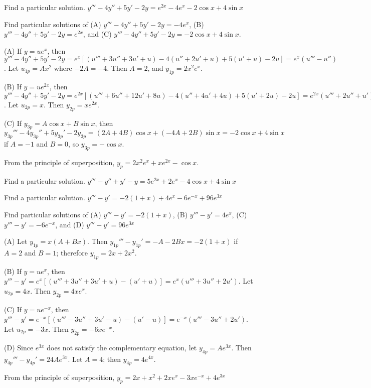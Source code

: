 \documentclass{ximera}
\begin{document}
\begin{problem}\label{exer:9.3.48}   Find a particular solution.   $y'''-4y''+5y'-2y=e^{2x}-4e^x-2\cos x+4\sin x$

\begin{hint}
Find particular solutions of
(A) $y'''-4y''+5y'-2y=-4e^x$,
(B) $y'''-4y''+5y'-2y=e^{2x}$,
and  (C) $y'''-4y''+5y'-2y=-2\cos x+4\sin x$.
\end{hint}

\begin{solution}
(A) If $y=ue^x$, then
$y'''-4y''+5y'-2y=e^x[(u'''+3u''+3u'+u) -4(u''+2u'+u) +5(u'+u)
-2u]=e^x(u'''-u'')$. Let $u_{1p}=Ax^2$ where $-2A=-4$. Then $A=2$,
and $y_{1p}=2x^2e^x$.

(B) If $y=ue^{2x}$, then
$y'''-4y''+5y'-2y=e^{2x}[(u'''+6u''+12u'+8u) -4(u''+4u'+4u) +5(u'+2u)
-2u ]=e^{2x}(u'''+2u''+u')$. Let $u_{2p}=x$. Then $y_{2p}=xe^{2x}$.

(C)  If $y_{3p}=A\cos x+B\sin x$, then
$y_{3p}'''-4y_{3p}''+5y_{3p}'-2y_{3p}=(2A+4B)\cos x+(-4A+2B)\sin x=
-2\cos x+4\sin x$
if  $A=-1$ and $B=0$, so
$y_{3p}=-\cos x$.

From the principle of superposition,
 $y_p=2x^2e^x+xe^{2x}-\cos x$.
\end{solution}
\end{problem}

\begin{problem}\label{exer:9.3.49}   Find a particular solution.   $y'''-y''+y'-y=5e^{2x}+2e^x-4\cos x+4\sin x$
\end{problem}

\begin{problem}\label{exer:9.3.50}   Find a particular solution.   $y'''-y'=-2(1+x)+4e^x-6e^{-x}+96e^{3x}$

\begin{hint}
Find particular solutions of (A)
$y'''-y'=-2(1+x)$, (B) $y'''-y'=4e^x$, (C)
$y'''-y'=-6e^{-x}$, and (D) $y'''-y'=96e^{3x}$
\end{hint}

\begin{solution}
(A) Let $y_{1p}=x(A+Bx)$. Then $y_{1p}'''-y_{1p}'=-A-2Bx=-2(1+x)$
if $A=2$ and $B=1$; therefore $y_{1p}=2x+2x^2$.

(B) If $y=ue^x$, then $y'''-y'=e^x [(u'''+3u''+3u'+u)
-(u'+u)]=e^x(u'''+3u''+2u')$. Let $u_{2p}=4x$. Then $y_{2p}=4xe^x$.

(C) If $y=ue^{-x}$, then $y'''-y'=e^{-x} [(u'''-3u''+3u'-u)
-(u'-u)]=e^{-x}(u'''-3u''+2u')$. Let $u_{2p}=-3x$. Then
$y_{2p}=-6xe^{-x}$.

(D) Since $e^{3x}$ does not satisfy the complementary equation,
let $y_{4p}=Ae^{3x}$. Then $y_{4p}'''-y_{4p}' =24Ae^{3x}$. Let $A=4$;
then $y_{4p}=4e^{4x}$.

From the principle of superposition,
$y_p=2x+x^2+2xe^x-3xe^{-x}+4e^{3x}$
\end{solution}
\end{problem}
\end{document}
